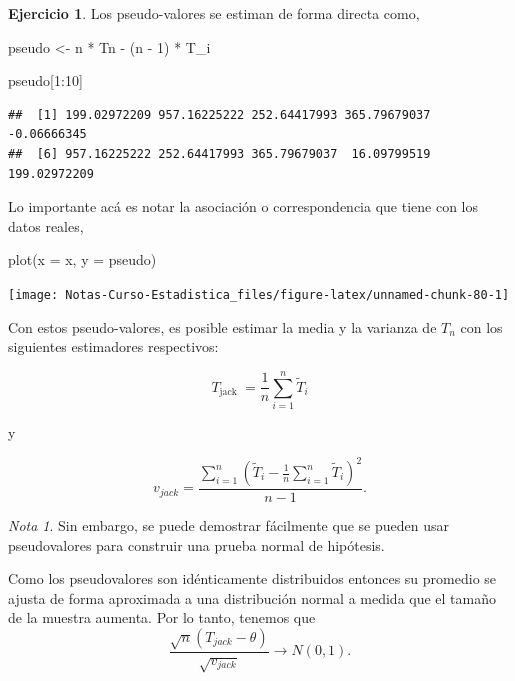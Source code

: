 \documentclass[
  12pt,
]{book}
\newenvironment{Shaded}{\begin{snugshade}}{\end{snugshade}}
\newcommand{\AttributeTok}[1]{\textcolor[rgb]{0.77,0.63,0.00}{#1}}
\newcommand{\DecValTok}[1]{\textcolor[rgb]{0.00,0.00,0.81}{#1}}
\newcommand{\FunctionTok}[1]{\textcolor[rgb]{0.00,0.00,0.00}{#1}}
\newcommand{\NormalTok}[1]{#1}
\newcommand{\OtherTok}[1]{\textcolor[rgb]{0.56,0.35,0.01}{#1}}
\newcommand{\SpecialCharTok}[1]{\textcolor[rgb]{0.00,0.00,0.00}{#1}}
\theoremstyle{definition}
\theoremstyle{definition}
\theoremstyle{definition}
\newtheorem{exercise}{Ejercicio}[chapter]
\theoremstyle{definition}
\theoremstyle{remark}
\newtheorem*{remark}{Nota}
\begin{document}
\begin{exercise}
\protect\hypertarget{exr:unnamed-chunk-78}{}\label{exr:unnamed-chunk-78}Los pseudo-valores se estiman de forma directa como,
\end{exercise}

\begin{Shaded}
\begin{Highlighting}[]
\NormalTok{pseudo }\OtherTok{\textless{}{-}}\NormalTok{ n }\SpecialCharTok{*}\NormalTok{ Tn }\SpecialCharTok{{-}}\NormalTok{ (n }\SpecialCharTok{{-}} \DecValTok{1}\NormalTok{) }\SpecialCharTok{*}\NormalTok{ T\_i}

\NormalTok{pseudo[}\DecValTok{1}\SpecialCharTok{:}\DecValTok{10}\NormalTok{]}
\end{Highlighting}
\end{Shaded}

\begin{verbatim}
##  [1] 199.02972209 957.16225222 252.64417993 365.79679037  -0.06666345
##  [6] 957.16225222 252.64417993 365.79679037  16.09799519 199.02972209
\end{verbatim}

Lo importante acá es notar la asociación o correspondencia que tiene con los datos reales,

\begin{Shaded}
\begin{Highlighting}[]
\FunctionTok{plot}\NormalTok{(}\AttributeTok{x =}\NormalTok{ x, }\AttributeTok{y =}\NormalTok{ pseudo)}
\end{Highlighting}
\end{Shaded}

\begin{center}\texttt{[image: Notas-Curso-Estadistica\_files/figure-latex/unnamed-chunk-80-1]} \end{center}

Con estos pseudo-valores, es posible estimar la media y la varianza de
\(T_{n}\) con los siguientes estimadores respectivos:

\[
T_{\text {jack }}=\frac{1}{n} \sum_{i=1}^{n} \widetilde{T}_{i}
\]

y

\[
v_{jack}=\frac{\sum_{i=1}^{n}\left(\widetilde{T}_{i}-\frac{1}{n}
\sum_{i=1}^{n} \widetilde{T}_{i}\right)^{2}}{n-1}.
\]

\begin{remark}
Sin embargo, se puede demostrar fácilmente que se pueden usar
pseudovalores para construir una prueba normal de hipótesis.

Como los pseudovalores son idénticamente distribuidos entonces su promedio se ajusta de forma aproximada a una distribución normal a medida
que el tamaño de la muestra aumenta. Por lo tanto, tenemos que
\[
  \frac{\sqrt{n}\left(T_{jack}-\theta\right)}{\sqrt{v_{jack}}}
  \rightarrow N(0,1).
\]
\end{remark}
\end{document}
